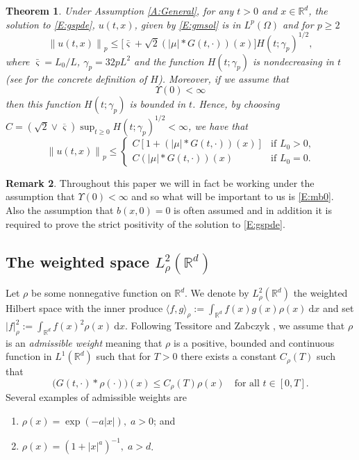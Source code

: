 \documentclass[a4paper,11pt]{article}%
\numberwithin{equation}{section}
\theoremstyle{plain}
\newtheorem{theorem}{Theorem}[section]
\theoremstyle{definition}
\newtheorem{remark}[theorem]{Remark}
\newcommand{\R}{\mathbb{R}}
\newcommand{\Norm}[1]{\left\|  #1   \right\|}
\newcommand{\ud}{\ensuremath{ \mathrm{d} }}
\begin{document}
\begin{theorem}
	\label{T:ExUn}
	Under Assumption \ref{A:General}, for any $t>0$ and $x \in \R^d$, the solution to \eqref{E:gspde}, $u(t,x)$,
	given by \eqref{E:gmsol} is in $L^p(\Omega)$ and for $p\ge 2$
	\begin{equation}
		\label{E:mb}
		\Norm{u(t,x)}_p \le \big[\bar{\varsigma}+\sqrt{2}(|\mu|*G(t,\cdot))(x)\big]H(t;\gamma_p)^{1/2},
	\end{equation}
	where $\bar{\varsigma}=L_0/L$, $\gamma_p = 32pL^2$ and the function $H(t;\gamma_p)$ is nondecreasing in $t$ (see \cite{CH16Comparison} for
	the concrete definition of $H$).
	Moreover, if we assume that
	\begin{equation}
		 \Upsilon(0) < \infty \label{A:dalcon0}
	\end{equation}
	then this function $H(t;\gamma_p)$ is bounded in $t$. Hence, by choosing
	$C=\left(\sqrt{2}\vee \overline{\varsigma}\right)\sup_{t\ge 0} H(t;\gamma_p)^{1/2}<\infty$,
	we have that
	\begin{equation}
		\label{E:mb0}
		\Norm{u(t,x)}_p \le
		\begin{cases}
			C\left[1+\left(|\mu|*G(t,\cdot)\right)(x)\right] & \text{if $L_0> 0$,}\\
			C\left(|\mu|*G(t,\cdot)\right)(x) & \text{if $L_0= 0$}.
		\end{cases}
	\end{equation}
\end{theorem}

\begin{remark}
	Throughout this paper we will in fact be working under the assumption that $\Upsilon(0) < \infty$ and so what
	will be important to us is \eqref{E:mb0}. Also the assumption that $b(x,0)=0$ is often assumed and in addition
	it is required to prove the strict positivity \cite{CH16Comparison} of the solution to \eqref{E:gspde}.
\end{remark}

\subsection{The weighted space $L^2_\rho(\R^d)$}

Let $\rho$ be some nonnegative function on $\R^d$.
We denote by $L^2_\rho(\R^d)$ the weighted Hilbert space with the inner produce $\langle f,g \rangle_\rho  :=
\int_{\R^d}f(x)g(x)\rho(x) \: \ud x$ and set $|f|_\rho^2 :=\int_{\R^d}f(x)^2\rho(x) \: \ud x$.
Following Tessitore and Zabczyk \cite{TessitoreZabczyk98M}, we assume that $\rho$ is an \textit{admissible weight}
meaning that $\rho$ is a positive, bounded and continuous function in $L^1(\R^d)$ such that for $T>0$ there exists a
constant $C_\rho(T)$ such that
\begin{equation}
	\big(G(t,\cdot)*\rho(\cdot)\big)(x) \le C_\rho(T) \rho(x) \quad \text{for all $t\in[0,T]$.} \label{E:aw}
\end{equation}
Several examples of admissible weights are
\begin{enumerate}
	\item $\rho(x)=\exp(-a|x|), \; a>0$; and
	\item $\rho(x) = (1+|x|^a)^{-1}, \; a>d$.
\end{enumerate}
\end{document}
